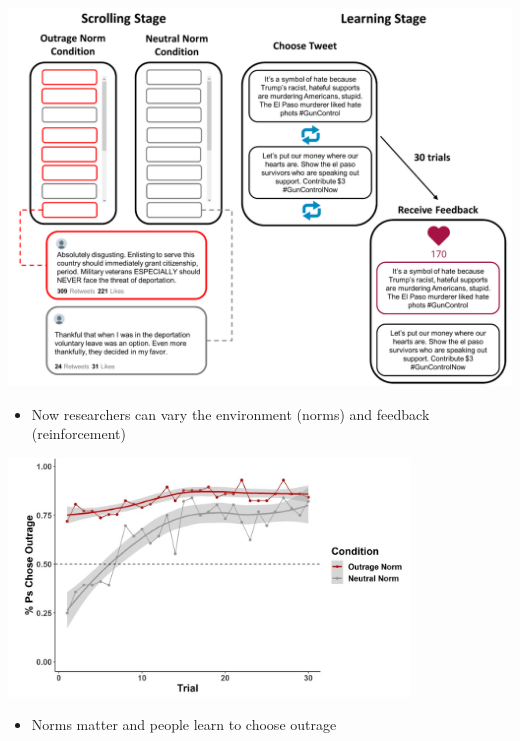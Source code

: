 \documentclass[aspectratio=169]{beamer}
\begin{document}
\begin{frame} 

\begin{center}
\includegraphics[height=0.8\textheight]{figures/brady_how_2021_fig3}
\end{center}

\begin{itemize}
\item Now researchers can vary the environment (norms) and feedback (reinforcement)
\end{itemize}

\end{frame}
\begin{frame} 

\begin{center}
\includegraphics[width=0.8\textwidth]{figures/brady_how_2021_fig4a}
\end{center}

\begin{itemize}
\item Norms matter and people learn to choose outrage
\end{itemize}

\end{frame}
\end{document}

